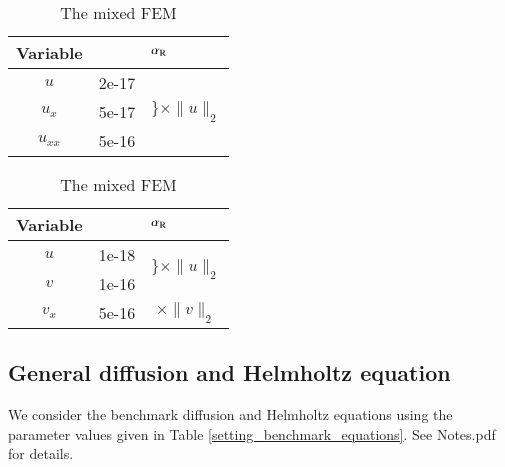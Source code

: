 \documentclass[review,3p]{elsarticle}
\begin{document}
\newpage
\begin{table}[!ht]
\small
{}
\hspace{3.5cm}
\begin{subtable}{0.4\textwidth}
\caption{The standard FEM}
\label{relation_alpha_R_l2_norm_std}
\begin{tabular}{c | l c}
\hline
Variable & \multicolumn{2}{c}{$\alpha_{\rm R}$} \\ \hline
$u$ & 2e-17 & \multirow{3}{*}{$\Bigg\}\times \|u\|_2$} \\ \cline{1-2}
$u_x$ & 5e-17 & \\ \cline{1-2}
$u_{xx}$ & 5e-16 & \\ \hline
\end{tabular}
\end{subtable}
\hspace{-2cm}
\begin{subtable}{.4\textwidth}
\caption{The mixed FEM}
\label{relation_alpha_R_l2_norm_mix}
\begin{tabular}{c | l c}
\hline
Variable & \multicolumn{2}{c}{$\alpha_{\rm R}$} \\ \hline
$u$ & 1e-18 & \multirow{2}{*}{$\bigg\}\times\|u\|_2$} \\ \cline{1-2} 
$v$ & 1e-16 &  \\ \hline
$v_x$ & 5e-16 & $\times \|v\|_2$ \\ \hline
\end{tabular}
\end{subtable}
\label{relation_alpha_R_l2_norm}
\end{table}

\subsection{General diffusion and Helmholtz equation}	\label{section_d_and_r}

We consider the benchmark diffusion and Helmholtz equations using the parameter values given in Table \ref{setting_benchmark_equations}. See Notes.pdf for details.
\end{document}
